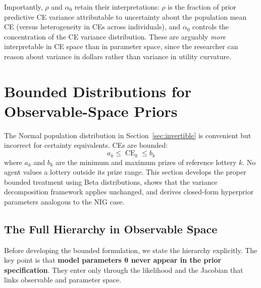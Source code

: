 \documentclass[11pt,a4paper]{article}
\theoremstyle{definition}
\newcommand{\btheta}{\boldsymbol{\theta}}
\DeclareMathOperator{\CE}{CE}
\begin{document}
Importantly, $\rho$ and $\alpha_0$ retain their interpretations: $\rho$ is the
fraction of prior predictive CE variance attributable to uncertainty about the
population mean CE (versus heterogeneity in CEs across individuals), and
$\alpha_0$ controls the concentration of the CE variance distribution. These
are arguably \emph{more} interpretable in CE space than in parameter space,
since the researcher can reason about variance in dollars rather than variance
in utility curvature.


\section{Bounded Distributions for Observable-Space Priors}
\label{sec:bounded}

The Normal population distribution in Section~\ref{sec:invertible} is
convenient but incorrect for certainty equivalents. CEs are bounded:
\begin{equation}
    a_k \leq \CE_k \leq b_k
\end{equation}
where $a_k$ and $b_k$ are the minimum and maximum prizes of reference lottery
$k$. No agent values a lottery outside its prize range. This section develops
the proper bounded treatment using Beta distributions, shows that the variance
decomposition framework applies unchanged, and derives closed-form hyperprior
parameters analogous to the NIG case.

\subsection{The Full Hierarchy in Observable Space}

Before developing the bounded formulation, we state the hierarchy explicitly.
The key point is that \textbf{model parameters $\btheta$ never appear in the
prior specification}. They enter only through the likelihood and the Jacobian
that links observable and parameter space.
\end{document}
